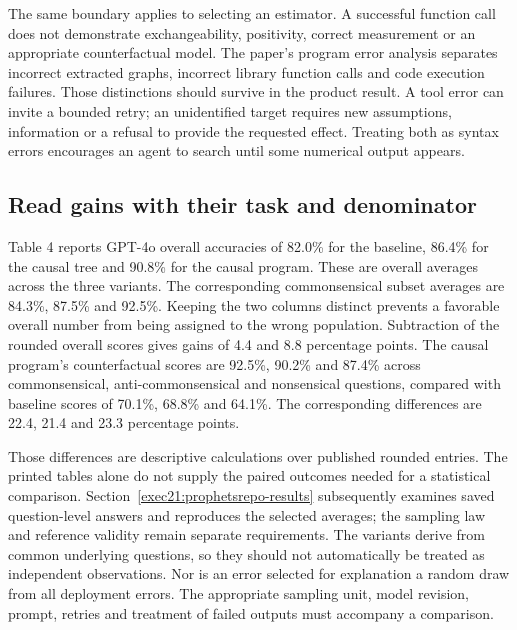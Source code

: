 The same boundary applies to selecting an estimator. A successful function call
does not demonstrate exchangeability, positivity, correct measurement or an
appropriate counterfactual model. The paper's program error analysis separates
incorrect extracted graphs, incorrect library function calls and code execution
failures. Those distinctions should survive in the product result. A tool error
can invite a bounded retry; an unidentified target requires new assumptions,
information or a refusal to provide the requested effect. Treating both as
syntax errors encourages an agent to search until some numerical output appears.
\citep{exec21_prophets}

\subsection{Read gains with their task and denominator}
\label{exec21:prophets-scores}
Table 4 reports GPT-4o overall accuracies of 82.0\% for the baseline,
86.4\% for the causal tree and 90.8\% for the causal program. These are
overall averages across the three variants. The corresponding commonsensical
subset averages are 84.3\%, 87.5\% and 92.5\%. Keeping the two columns distinct
prevents a favorable overall number from being assigned to the wrong
population. Subtraction of the rounded overall scores gives gains of 4.4 and
8.8 percentage points. The causal program's counterfactual scores are 92.5\%,
90.2\% and 87.4\% across commonsensical, anti-commonsensical and nonsensical
questions, compared with baseline scores of 70.1\%, 68.8\% and 64.1\%.
The corresponding differences are 22.4, 21.4 and 23.3 percentage points.
\citep{exec21_prophets,exec21_prophets_reference}

Those differences are descriptive calculations over published rounded entries.
The printed tables alone do not supply the paired outcomes needed for a statistical comparison. Section~\ref{exec21:prophetsrepo-results} subsequently examines saved question-level answers and reproduces the selected averages; the sampling law and reference validity remain separate requirements. The variants derive
from common underlying questions, so they should not automatically be treated
as independent observations. Nor is an error selected for explanation a random
draw from all deployment errors. The appropriate sampling unit, model revision,
prompt, retries and treatment of failed outputs must accompany a comparison.

